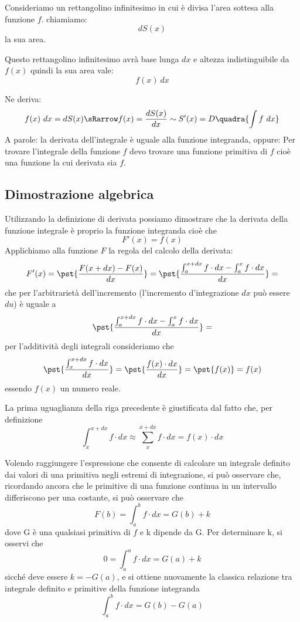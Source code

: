 \begin{minipage}{.49 \textwidth}
Consideriamo un rettangolino infinitesimo in cui è divisa l'area sottesa alla 
funzione \(f\). chiamiamo:
\[d S(x)\]
la sua area. 

Questo rettangolino infinitesimo avrà base lunga \(dx\) e 
altezza indistinguibile da \(f(x)\) quindi la sua area vale:
\[f(x)~dx\]
\end{minipage}
\hfill
\begin{minipage}{.49 \textwidth}
\begin{inaccessibleblock}[]  
  \begin{center} \teoremafonda \end{center}
\end{inaccessibleblock}
\end{minipage}

Ne deriva:
\[f(x)~dx = d S(x) \sRarrow f(x) = \frac{d S(x)}{dx} \sim S'(x) =
  D\quadra{\int f~dx}\]
A parole: la derivata dell'integrale è uguale alla funzione integranda, 
oppure:
Per trovare l'integrale della funzione \(f\) devo trovare una funzione 
primitiva di \(f\) cioè una funzione la cui derivata  sia \(f\).

\subsection{Dimostrazione algebrica}

Utilizzando la definizione di derivata possiamo
dimostrare che la derivata della funzione integrale è proprio la 
funzione integranda cioè che  
\[F'(x) = f(x)\]
Applichiamo alla funzione \(F\) la regola del calcolo della derivata:
\[F'(x) = \pst{\frac{F(x+dx)-F(x)}{dx}} = 
\pst{\frac{\int_a^{x+dx} f \cdot dx - \int_a^x f \cdot dx}{dx}} =\] 
che per l'arbitrarietà dell'incremento (l'incremento d'integrazione \(dx\) 
può essere \(du\)) è uguale a
\[\pst{\frac{\int_a^{x+dx} f \cdot dx - \int_a^x f \cdot dx}{dx}} =\]
per l'additività degli integrali consideriamo che
\[\pst{\frac{\int_x^{x+dx} f \cdot dx}{dx}} = 
    \pst{\frac{f(x) \cdot dx}{dx}} = \pst{f(x)} = f(x)\]
essendo \(f(x)\) un numero reale. 

La prima uguaglianza della riga
precedente è giustificata dal fatto che, per definizione 
\[\int_x^{x+dx} f \cdot dx \approx \sum_x^{x+dx} f \cdot dx = f(x) \cdot dx\]

Volendo raggiungere l'espressione che consente di calcolare un integrale 
definito dai valori di una primitiva negli estremi di integrazione, si può 
osservare che, ricordando ancora che le primitive di una funzione continua in 
un intervallo differiscono per una costante, si può osservare che
\[F(b) = \int_a^b f \cdot dx = G(b) + k\]
dove G è una qualsiasi primitiva di \(f\) e k dipende da G. Per determinare k, 
si osservi che
\[0 = \int_a^a f \cdot dx = G(a) + k\]
sicché deve essere \(k = - G(a)\), e si ottiene nuovamente la classica 
relazione tra integrale definito e primitive della funzione integranda 
\[\int_a^b f \cdot dx = G(b) - G(a)\]

